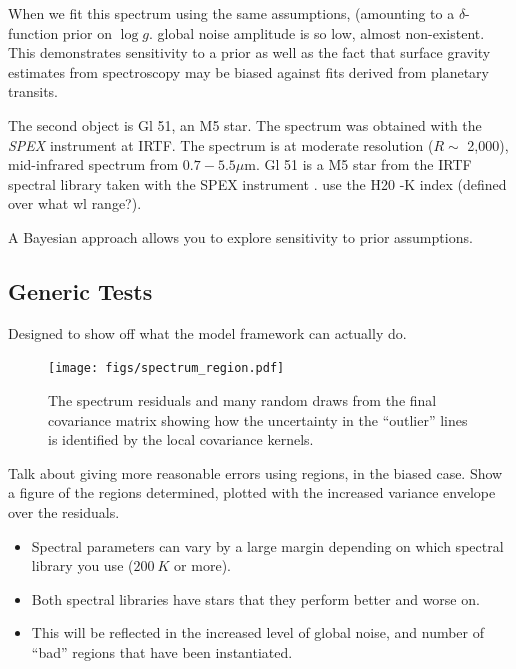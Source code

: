 \documentclass[iop,floatfix]{emulateapj}
\begin{document}
When we fit this spectrum using the same assumptions, (amounting to a $\delta$-function prior on $\log g$. global noise amplitude is so low, almost non-existent. This demonstrates sensitivity to a prior as well as the fact that surface gravity estimates from spectroscopy may be biased against fits derived from planetary transits.

The second object is Gl 51, an M5 star. The spectrum was obtained with the \emph{SPEX} instrument at IRTF. The spectrum is at moderate resolution ($R \sim $ 2,000), mid-infrared spectrum from $0.7 - 5.5\mu$m. Gl 51 is a M5 star from the IRTF spectral library \citep{cushing05, rayner09} taken with the SPEX instrument \citep{rayner03}. \citep{rojas-ayala12} use the H20 -K index (defined over what wl range?). 

A Bayesian approach allows you to explore sensitivity to prior assumptions.

\subsection{Generic Tests}

Designed to show off what the model framework can actually do. 

\begin{figure}[!htb]
\begin{center}
  \texttt{[image: figs/spectrum\_region.pdf]}
  \caption{The spectrum residuals and many random draws from the final covariance matrix showing how the uncertainty in the ``outlier'' lines is identified by the local covariance kernels.}
\label{fig:regions}
\end{center}
\end{figure}

Talk about giving more reasonable errors using regions, in the biased case.
Show a figure of the regions determined, plotted with the increased variance envelope over the residuals.

\begin{itemize}
  \item Spectral parameters can vary by a large margin depending on which spectral library you use ($200~K$ or more).
  \item Both spectral libraries have stars that they perform better and worse on.
  \item This will be reflected in the increased level of global noise, and number of ``bad'' regions that have been instantiated.
\end{itemize}
\end{document}
